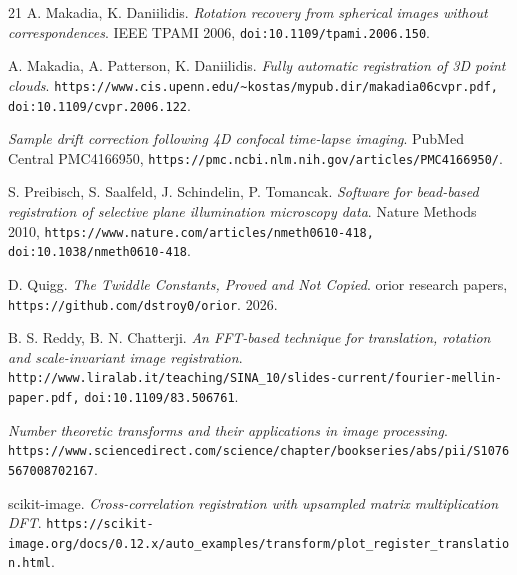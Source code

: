 \begin{thebibliography}{21}
A. Makadia, K. Daniilidis. \emph{Rotation recovery from spherical images without correspondences}. IEEE TPAMI 2006, \texttt{doi:10.1109/\allowbreak{}tpami.2006.150}.

A. Makadia, A. Patterson, K. Daniilidis. \emph{Fully automatic registration of 3D point clouds}. \texttt{https:/\allowbreak{}/\allowbreak{}www.cis.upenn.edu/\allowbreak{}\textasciitilde{}kostas/\allowbreak{}mypub.dir/\allowbreak{}makadia06cvpr.pdf,} \texttt{doi:10.1109/\allowbreak{}cvpr.2006.122}.

\emph{Sample drift correction following 4D confocal time-lapse imaging}. PubMed Central PMC4166950, \texttt{https:/\allowbreak{}/\allowbreak{}pmc.ncbi.nlm.nih.gov/\allowbreak{}articles/\allowbreak{}PMC4166950/\allowbreak{}}.

S. Preibisch, S. Saalfeld, J. Schindelin, P. Tomancak. \emph{Software for bead-based registration of selective plane illumination microscopy data}. Nature Methods 2010, \texttt{https:/\allowbreak{}/\allowbreak{}www.nature.com/\allowbreak{}articles/\allowbreak{}nmeth0610-418,} \texttt{doi:10.1038/\allowbreak{}nmeth0610-418}.

D. Quigg. \emph{The Twiddle Constants, Proved and Not Copied}. orior research papers, \texttt{https:/\allowbreak{}/\allowbreak{}github.com/\allowbreak{}dstroy0/\allowbreak{}orior}. 2026.

B. S. Reddy, B. N. Chatterji. \emph{An FFT-based technique for translation, rotation and scale-invariant image registration}. \texttt{http:/\allowbreak{}/\allowbreak{}www.liralab.it/\allowbreak{}teaching/\allowbreak{}SINA\_\allowbreak{}10/\allowbreak{}slides-current/\allowbreak{}fourier-mellin-paper.pdf,} \texttt{doi:10.1109/\allowbreak{}83.506761}.

\emph{Number theoretic transforms and their applications in image processing}. \texttt{https:/\allowbreak{}/\allowbreak{}www.sciencedirect.com/\allowbreak{}science/\allowbreak{}chapter/\allowbreak{}bookseries/\allowbreak{}abs/\allowbreak{}pii/\allowbreak{}S1076567008702167}.

scikit-image. \emph{Cross-correlation registration with upsampled matrix multiplication DFT}. \texttt{https:/\allowbreak{}/\allowbreak{}scikit-image.org/\allowbreak{}docs/\allowbreak{}0.12.x/\allowbreak{}auto\_\allowbreak{}examples/\allowbreak{}transform/\allowbreak{}plot\_\allowbreak{}register\_\allowbreak{}translation.html}.


\end{thebibliography}
